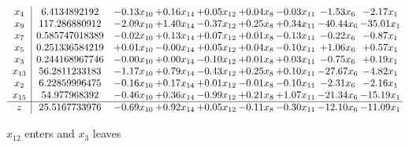 \documentclass[9pt]{article}
\begin{document}
 \[\begin{array}{c| c c@{\hskip 2pt} c@{\hskip 2pt} c@{\hskip 2pt} c@{\hskip 2pt} c@{\hskip 2pt} c@{\hskip 2pt} c@{\hskip 2pt} }
 x_{4}   &  6.4134892192 & -0.13 x_{10} & +  0.16 x_{14} & +  0.05 x_{12} & +  0.04 x_{8} & -0.03 x_{11} & -1.53 x_{6} & -2.17 x_{1}\\
 x_{9}   &  117.286880912 & -2.09 x_{10} & +  1.40 x_{14} & -0.37 x_{12} & +  0.25 x_{8} & +  0.34 x_{11} & -40.44 x_{6} & -35.01 x_{1}\\
 x_{7}   &  0.585747018389 & -0.02 x_{10} & +  0.13 x_{14} & +  0.07 x_{12} & +  0.01 x_{8} & -0.13 x_{11} & -0.22 x_{6} & -0.87 x_{1}\\
 x_{5}   &  0.251336584219 & +  0.01 x_{10} & -0.00 x_{14} & +  0.05 x_{12} & +  0.04 x_{8} & -0.10 x_{11} & +  1.06 x_{6} & +  0.57 x_{1}\\
 x_{3}   &  0.244168967746 & -0.00 x_{10} & +  0.00 x_{14} & -0.10 x_{12} & +  0.01 x_{8} & +  0.03 x_{11} & -0.75 x_{6} & +  0.19 x_{1}\\
 x_{13}   &  56.2811233183 & -1.17 x_{10} & +  0.79 x_{14} & -0.43 x_{12} & +  0.25 x_{8} & +  0.10 x_{11} & -27.67 x_{6} & -4.82 x_{1}\\
 x_{2}   &  6.22859996475 & -0.16 x_{10} & +  0.17 x_{14} & +  0.01 x_{12} & -0.01 x_{8} & -0.10 x_{11} & -2.31 x_{6} & -2.16 x_{1}\\
 x_{15}   &  54.977968392 & -0.46 x_{10} & +  0.36 x_{14} & -0.99 x_{12} & +  0.21 x_{8} & +  1.07 x_{11} & -21.34 x_{6} & -15.19 x_{1}\\
\hline
z    &  25.5167733976 & -0.69 x_{10} & +  0.92 x_{14} & +  0.05 x_{12} & -0.11 x_{8} & -0.30 x_{11} & -12.10 x_{6} & -11.09 x_{1}\\
\end{array}\]


 $ x_{12} $ enters and $ x_{3} $ leaves 
\end{document}
